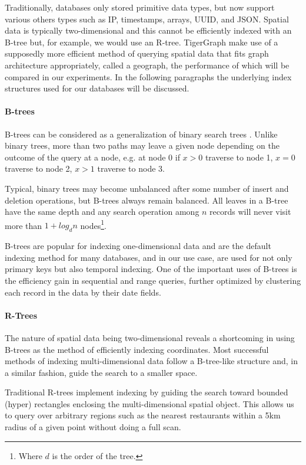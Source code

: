 Traditionally, databases only stored primitive data types, but now support various others types such as IP, timestamps, arrays, UUID, and JSON. Spatial data is typically two-dimensional and this cannot be efficiently indexed with an B-tree but, for example, we would use an R-tree. TigerGraph make use of a supposedly more efficient method of querying spatial data that fits graph architecture appropriately, called a geograph, the performance of which will be compared in our experiments. In the following paragraphs the underlying index structures used for our databases will be discussed.

\paragraph{B-trees}
B-trees can be considered as a generalization of binary search trees \cite{btree}. Unlike binary trees, more than two paths may leave a given node depending on the outcome of the query at a node, e.g. at node 0 if $x>0$ traverse to node 1, $x=0$ traverse to node 2, $x>1$ traverse to node 3.

Typical, binary trees may become unbalanced after some number of insert and deletion operations, but B-trees always remain balanced. All leaves in a B-tree have the same depth and any search operation among $n$ records will never visit more than $1 + log_dn$ nodes\footnote{Where $d$ is the order of the tree.}.

B-trees are popular for indexing one-dimensional data and are the default indexing method for many databases, and in our use case, are used for not only primary keys but also temporal indexing. One of the important uses of B-trees is the efficiency gain in sequential and range queries, further optimized by clustering each record in the data by their date fields.

\paragraph{R-Trees}

The nature of spatial data being two-dimensional reveals a shortcoming in using B-trees as the method of efficiently indexing coordinates. Most successful methods of indexing multi-dimensional data follow a B-tree-like structure \cite{rtree} and, in a similar fashion, guide the search to a smaller space.

Traditional R-trees implement indexing by guiding the search toward bounded (hyper) rectangles enclosing the multi-dimensional spatial object. This allows us to query over arbitrary regions such as the nearest restaurants within a 5km radius of a given point without doing a full scan.

